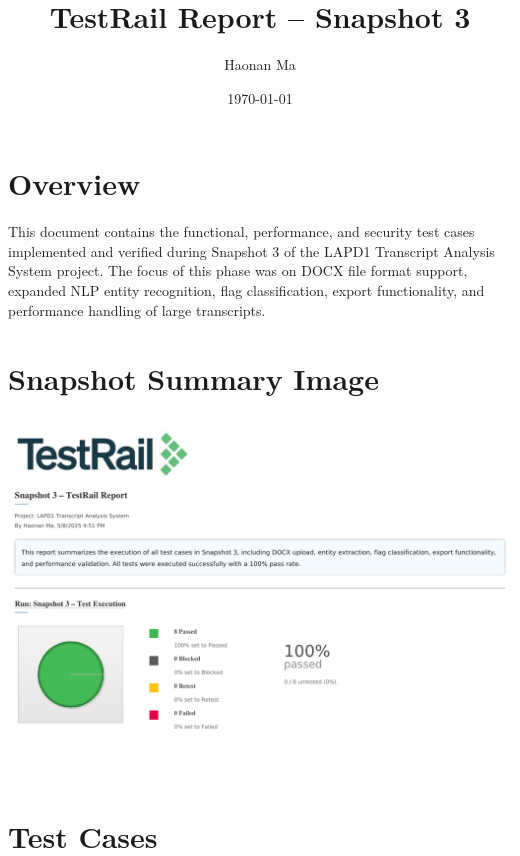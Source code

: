 \documentclass[12pt]{article}
\title{TestRail Report – Snapshot 3}
\author{Haonan Ma}
\date{\today}
\begin{document}
\maketitle

\section*{Overview}
This document contains the functional, performance, and security test cases implemented and verified during Snapshot 3 of the LAPD1 Transcript Analysis System project. The focus of this phase was on DOCX file format support, expanded NLP entity recognition, flag classification, export functionality, and performance handling of large transcripts.

\section*{Snapshot Summary Image}
\begin{center}
    \includegraphics[width=\textwidth]{snapshot3image}
\end{center}

\section*{Test Cases}
\end{document}
